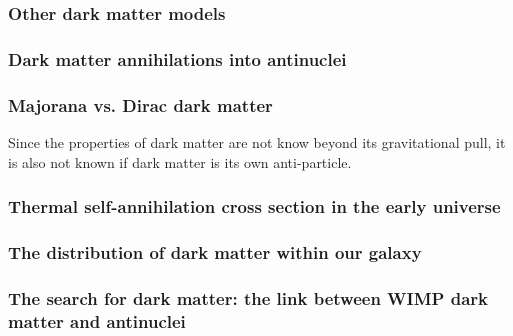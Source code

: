 \subsubsection{Other dark matter models}\label{IntroOtherDM}
\subsubsection{Dark matter annihilations into antinuclei}
\subsubsection{Majorana vs. Dirac dark matter}\label{sec:IntroMajoranaDiracDM}
Since the properties of dark matter are not know beyond its gravitational pull, it is also not known if dark matter is its own anti-particle. 
\subsubsection{Thermal self-annihilation cross section in the early universe}
\subsubsection{The distribution of dark matter within our galaxy}
\subsubsection{The search for dark matter: the link between WIMP dark matter and antinuclei}